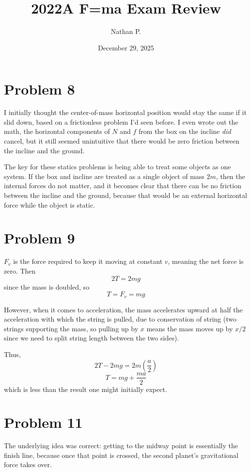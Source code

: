 \documentclass[11pt]{article}
\title{2022A F=ma Exam Review}
\author{Nathan P.}
\date{December 29, 2025}
\begin{document}
\maketitle

\section*{Problem 8}
\hspace*{\parindent} I initially thought the center-of-mass horizontal position would stay the same if it slid down, based on a frictionless problem I'd seen before. I even wrote out the math, the horizontal components of $N$ and $f$ from the box on the incline \emph{did} cancel, but it still seemed unintuitive that there would be zero friction between the incline and the ground.

The key for these statics problems is being able to treat some objects as one system. If the box and incline are treated as a single object of mass $2m$, then the internal forces do not matter, and it becomes clear that there can be no friction between the incline and the ground, because that would be an external horizontal force while the object is static.

\section*{Problem 9}
$F_v$ is the force required to keep it moving at constant $v$, meaning the net force is zero. Then
\[
2T=2mg
\]
since the mass is doubled, so
\[
T=F_v=mg
\]

However, when it comes to acceleration, the mass accelerates upward at half the acceleration with which the string is pulled, due to conservation of string (two strings supporting the mass, so pulling up by $x$ means the mass moves up by $x/2$ since we need to split string length between the two sides).

Thus,
\[
2T-2mg=2m\left(\frac{a}{2}\right)
\]
\[
T=mg+\frac{ma}{2}
\]
which is less than the result one might initially expect.

\section*{Problem 11}
\hspace*{\parindent} The underlying idea was correct: getting to the midway point is essentially the finish line, because once that point is crossed, the second planet's gravitational force takes over.
\end{document}
